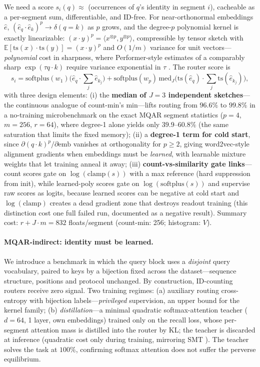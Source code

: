 \documentclass[11pt]{article}
\begin{document}
We need a score $s_i(q)\approx$ (occurrences of $q$'s identity in segment $i$),
cacheable as a per-segment sum, differentiable, and ID-free. For near-orthonormal
embeddings $\hat e$,
$(\hat e_q\!\cdot\!\hat e_k)^p\to\delta(q=k)$ as $p$ grows, and the degree-$p$
polynomial kernel is exactly linearizable:
$(x\!\cdot\!y)^p = \langle x^{\otimes p},y^{\otimes p}\rangle$, compressible by
tensor sketch \citep{pham2013tensorsketch} with
$\mathbb{E}[\mathrm{ts}(x)\!\cdot\!\mathrm{ts}(y)]=(x\!\cdot\!y)^p$ and
$O(1/m)$ variance for unit vectors---\emph{polynomial} cost in sharpness, where
Performer-style estimates of a comparably sharp $\exp(\tau q\!\cdot\!k)$ require
variance exponential in $\tau$ \citep{choromanski2021performer}. The router score
is
\[
s_i = \mathrm{softplus}(w_1)\big(\hat e_q\!\cdot\!\textstyle\sum_j\hat e_{k_j}\big)
      + \mathrm{softplus}(w_p)\,\mathrm{med}_{J}\!\big(\mathrm{ts}(\hat e_q)\!\cdot\!\textstyle\sum_j\mathrm{ts}(\hat e_{k_j})\big),
\]
with three design elements: (i) the \textbf{median of $J=3$ independent
sketches}---the continuous analogue of count-min's min---lifts routing from
$96.6\%$ to $99.8\%$ in a no-training microbenchmark on the exact MQAR segment
statistics ($p=4$, $m=256$, $r=64$), where degree-1 alone yields only
$39.9$--$60.8\%$ (the same saturation that limits the fixed memory); (ii) a
\textbf{degree-1 term for cold start}, since
$\partial(q\!\cdot\!k)^p/\partial\mathrm{emb}$ vanishes at orthogonality for
$p\ge 2$, giving word2vec-style alignment gradients when embeddings must be
\emph{learned}, with learnable mixture weights that let training anneal it away;
(iii) \textbf{count-vs-similarity gate links}---count scores gate on
$\log(\mathrm{clamp}(s))$ with a max reference (hard suppression from init), while
learned-poly scores gate on $\log(\mathrm{softplus}(s))$ and supervise raw scores
as logits, because learned scores can be negative at cold start and
$\log(\mathrm{clamp})$ creates a dead gradient zone that destroys readout training
(this distinction cost one full failed run, documented as a negative result).
Summary cost: $r + J\!\cdot\!m = 832$ floats/segment (count-min: 256; histogram:
$V$).

\paragraph{MQAR-indirect: identity must be learned.} We introduce a benchmark in
which the query block uses a \emph{disjoint} query vocabulary, paired to keys by a
bijection fixed across the dataset---sequence structure, positions and protocol
unchanged. By construction, ID-counting routers receive zero signal. Two training
regimes: (a) auxiliary routing cross-entropy with bijection labels---\emph{privileged}
supervision, an upper bound for the kernel family; (b) \emph{distillation}---a
minimal quadratic softmax-attention teacher ($d=64$, 1 layer, own embeddings)
trained only on the recall loss, whose per-segment attention mass is distilled
into the router by KL; the teacher is discarded at inference (quadratic cost only
during training, mirroring SMT \citep{kumar2026smt}). The teacher solves the task
at $100\%$, confirming softmax attention does not suffer the perverse equilibrium.
\end{document}
